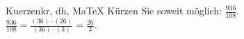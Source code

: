\begin{MAufgabe}{Kuerzen}{kr, dh, MaTeX}
K\"urzen Sie soweit m\"oglich: $\frac{936}{108}$.\\ 
\ifLsg\MLoesung
\quad $\frac{936}{108}=\frac{(36)\cdot(26)}{(36)\cdot(3)}=\frac{26}{3}$.\else\relax\fi
 \end{MAufgabe}